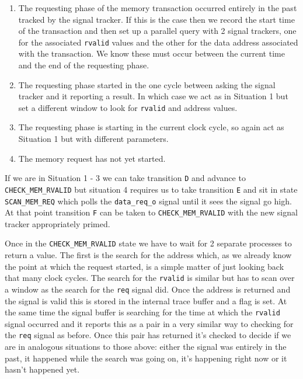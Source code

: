 \begin{enumerate}
	\item The requesting phase of the memory transaction occurred entirely in the past tracked by the signal tracker. If this is the case then we record the start time of the transaction and then set up a parallel query with 2 signal trackers, one for the associated \texttt{rvalid} values and the other for the data address associated with the transaction. We know these must occur between the current time and the end of the requesting phase.
	\item The requesting phase started in the one cycle between asking the signal tracker and it reporting a result. In which case we act as in Situation 1 but set a different window to look for \texttt{rvalid} and address values.
	\item The requesting phase is starting in the current clock cycle, so again act as Situation 1 but with different parameters.
	\item The memory request has not yet started.
\end{enumerate}

If we are in Situation 1 - 3 we can take transition \texttt{D} and advance to \texttt{CHECK\_MEM\_RVALID} but situation 4 requires us to take transition \texttt{E} and sit in state \texttt{SCAN\_MEM\_REQ} which polls the \texttt{data\_req\_o} signal until it sees the signal go high. At that point transition \texttt{F} can be taken to \texttt{CHECK\_MEM\_RVALID} with the new signal tracker appropriately primed. 

Once in the \texttt{CHECK\_MEM\_RVALID} state we have to wait for 2 separate processes to return a value. The first is the search for the address which, as we already know the point at which the request started, is a simple matter of just looking back that many clock cycles. The search for the \texttt{rvalid} is similar but has to scan over a window as the search for the \texttt{req} signal did. Once the address is returned and the signal is valid this is stored in the internal trace buffer and a flag is set. At the same time the signal buffer is searching for the time at which the \texttt{rvalid} signal occurred and it reports this as a pair in a very similar way to checking for the \texttt{req} signal as before. Once this pair has returned it's checked to decide if we are in analogous situations to those above: either the signal was entirely in the past, it happened while the search was going on, it's happening right now or it hasn't happened yet. 

